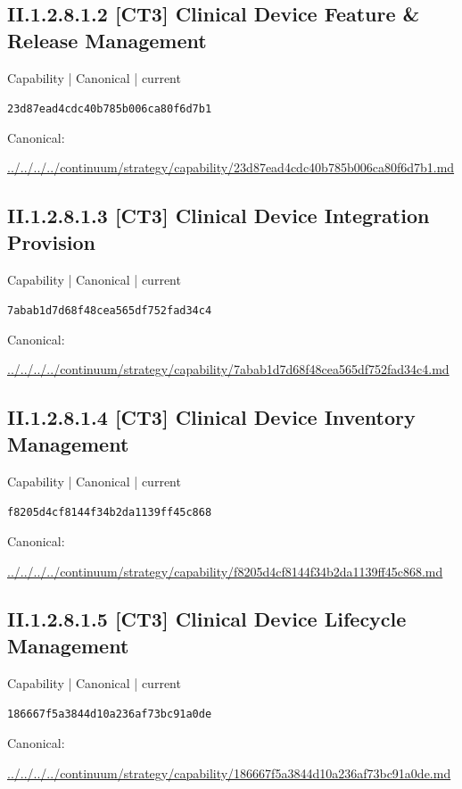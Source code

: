 \documentclass[10pt,a4paper]{article}
\begin{document}
\subsection*{II.1.2.8.1.2 [CT3] Clinical Device Feature \& Release Management}
\label{element-23d87ead4cdc40b785b006ca80f6d7b1}
{\small Capability | Canonical | current}\par
\texttt{23d87ead4cdc40b785b006ca80f6d7b1}\par
Canonical: \par
{\footnotesize\url{../../../../continuum/strategy/capability/23d87ead4cdc40b785b006ca80f6d7b1.md}}\par
\subsection*{II.1.2.8.1.3 [CT3] Clinical Device Integration Provision}
\label{element-7abab1d7d68f48cea565df752fad34c4}
{\small Capability | Canonical | current}\par
\texttt{7abab1d7d68f48cea565df752fad34c4}\par
Canonical: \par
{\footnotesize\url{../../../../continuum/strategy/capability/7abab1d7d68f48cea565df752fad34c4.md}}\par
\subsection*{II.1.2.8.1.4 [CT3] Clinical Device Inventory Management}
\label{element-f8205d4cf8144f34b2da1139ff45c868}
{\small Capability | Canonical | current}\par
\texttt{f8205d4cf8144f34b2da1139ff45c868}\par
Canonical: \par
{\footnotesize\url{../../../../continuum/strategy/capability/f8205d4cf8144f34b2da1139ff45c868.md}}\par
\subsection*{II.1.2.8.1.5 [CT3] Clinical Device Lifecycle Management}
\label{element-186667f5a3844d10a236af73bc91a0de}
{\small Capability | Canonical | current}\par
\texttt{186667f5a3844d10a236af73bc91a0de}\par
Canonical: \par
{\footnotesize\url{../../../../continuum/strategy/capability/186667f5a3844d10a236af73bc91a0de.md}}\par
\end{document}
